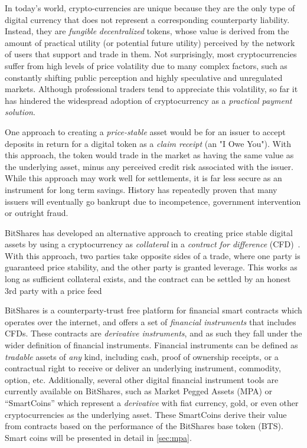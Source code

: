 In today's world, crypto-currencies are unique because they are the only type
of digital currency that does not represent a corresponding counterparty
liability. Instead, they are \emph{fungible} \emph{decentralized} tokens, whose
value is derived from the amount of practical utility (or potential future
utility) perceived by the network of users that support and trade in them. Not
surprisingly, most cryptocurrencies suffer from high levels of price volatility
due to many complex factors, such as constantly shifting public perception and
highly speculative and unregulated markets. Although professional traders tend
to appreciate this volatility, so far it has hindered the widespread adoption
of cryptocurrency as a \emph{practical payment solution}.

One approach to creating a \emph{price-stable} asset would be for an issuer to
accept deposits in return for a digital token as a \emph{claim receipt} (an "I
Owe You"). With this approach, the token would trade in the market as having
the same value as the underlying asset, minus any perceived credit risk
associated with the issuer. While this approach may work well for settlements,
it is far less secure as an instrument for long term savings. History has
repeatedly proven that many issuers will eventually go bankrupt due to
incompetence, government intervention or outright fraud.

BitShares has developed an alternative approach to creating price stable
digital assets by using a cryptocurrency as \emph{collateral} in a
\emph{contract for difference} (CFD)~\cite{def:cfd}. With this approach, two
parties take opposite sides of a trade, where one party is guaranteed price
stability, and the other party is granted leverage. This works as long as
sufficient collateral exists, and the contract can be settled by an honest 3rd
party with a price feed

BitShares is a counterparty-trust free platform for financial smart contracts
which operates over the internet, and offers a set of \emph{financial
instruments} that includes CFDs. These contracts are \emph{derivative
instruments}, and as such they fall under the wider definition of financial
instruments. Financial instruments can be defined as \emph{tradable} assets of
\emph{any} kind, including cash, proof of ownership receipts, or a contractual
right to receive or deliver an underlying instrument, commodity, option, etc.
Additionally, several other digital financial instrument tools are currently
available on BitShares, such as Market Pegged Assets (MPA) or ``SmartCoins''
which represent a \emph{derivative} with fiat currency, gold, or even other
cryptocurrencies as the underlying asset. These SmartCoins derive their value
from contracts based on the performance of the BitShares base token (BTS).
Smart coins will be presented in detail in \cref{sec:mpa}. 

